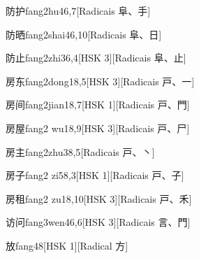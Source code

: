 \begin{entry}{防护}{fang2hu4}{6,7}[Radicais ⾩、⼿]
\end{entry}

\begin{entry}{防晒}{fang2shai4}{6,10}[Radicais ⾩、⽇]
\end{entry}

\begin{entry}{防止}{fang2zhi3}{6,4}[HSK 3][Radicais ⾩、⽌]
\end{entry}

\begin{entry}{房东}{fang2dong1}{8,5}[HSK 3][Radicais ⼾、⼀]
\end{entry}

\begin{entry}{房间}{fang2jian1}{8,7}[HSK 1][Radicais ⼾、⾨]
\end{entry}

\begin{entry}{房屋}{fang2 wu1}{8,9}[HSK 3][Radicais ⼾、⼫]
\end{entry}

\begin{entry}{房主}{fang2zhu3}{8,5}[Radicais ⼾、⼂]
\end{entry}

\begin{entry}{房子}{fang2 zi5}{8,3}[HSK 1][Radicais ⼾、⼦]
\end{entry}

\begin{entry}{房租}{fang2 zu1}{8,10}[HSK 3][Radicais ⼾、⽲]
\end{entry}

\begin{entry}{访问}{fang3wen4}{6,6}[HSK 3][Radicais ⾔、⾨]
\end{entry}

\begin{entry}{放}{fang4}{8}[HSK 1][Radical ⽅]
\end{entry}


